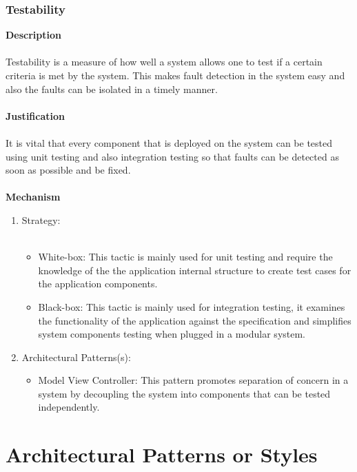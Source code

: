 \documentclass[hidelinks, 12pt, oneside]{article}
\begin{document}
			\subsubsection{Testability}
			\textbf{Description}\\\\
			Testability is a measure of how well a system allows one to test if a certain criteria is met by the system. This makes fault detection in the system easy and also the faults can be isolated in a timely manner.\\\\
			\textbf{Justification}\\\\
			It is vital that every component that is deployed on the system can be tested using unit testing and also integration testing so that faults can be detected as soon as possible and be fixed. \\\\
			\textbf{Mechanism}
			\begin{enumerate}
				\item Strategy:\\\\
				\begin{itemize}
				\item White-box: This tactic is mainly used for unit testing and require the knowledge of the the application internal structure to create test cases for the application components.
				\item Black-box: This tactic is mainly used for integration testing, it examines the functionality of the application against the specification and simplifies system components testing when plugged in a modular system.
				\end{itemize}
				\item Architectural Patterns(s):
				\begin{itemize}
				\item Model View Controller: This pattern promotes separation of concern in a system by decoupling the system into components that can be tested independently.   
				\end{itemize}
			\end{enumerate}	
    \newpage
    \section{Architectural Patterns or Styles}
\end{document}
